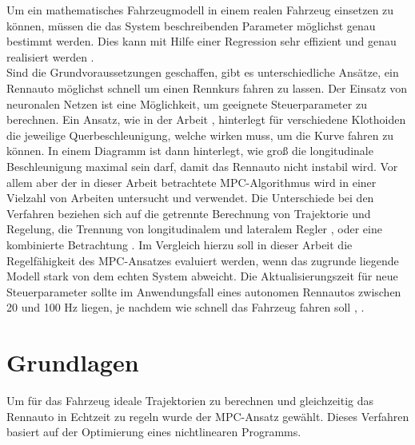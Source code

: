 \documentclass{like}
\begin{document}
Um ein mathematisches Fahrzeugmodell in einem realen Fahrzeug einsetzen zu können, müssen die das System beschreibenden Parameter möglichst genau bestimmt werden. Dies kann mit Hilfe einer Regression sehr effizient und genau realisiert werden \cite{Williams2016AggressiveDW}. \\ 
\newline
Sind die Grundvoraussetzungen geschaffen, gibt es unterschiedliche Ansätze, ein Rennauto möglichst schnell um einen Rennkurs fahren zu lassen. Der Einsatz von neuronalen Netzen \cite{6374146} ist eine Möglichkeit, um geeignete Steuerparameter zu berechnen. 
Ein Ansatz, wie in der Arbeit \cite{KRITAYAKIRANA2010548}, hinterlegt für verschiedene Klothoiden die jeweilige Querbeschleunigung, welche wirken muss, um die Kurve fahren zu können. In einem Diagramm ist dann hinterlegt, wie groß die longitudinale Beschleunigung maximal sein darf, damit das Rennauto nicht instabil wird. Vor allem aber der in dieser Arbeit betrachtete \ac{MPC}-Algorithmus wird in einer Vielzahl von Arbeiten untersucht und verwendet. 
Die Unterschiede bei den Verfahren beziehen sich auf die getrennte Berechnung von Trajektorie und Regelung, die Trennung von longitudinalem und lateralem Regler \cite{MPC_Dynamic}, \cite{MPC_Dynamic_Tire_Model} oder eine kombinierte Betrachtung \cite{rc_car_1_43}. Im Vergleich hierzu soll in dieser Arbeit die Regelfähigkeit des \ac{MPC}-Ansatzes evaluiert werden, wenn das zugrunde liegende Modell stark von dem echten System abweicht.
\newline
Die Aktualisierungszeit für neue Steuerparameter sollte im Anwendungsfall eines au\-to\-nomen Rennautos zwischen 20 und 100 Hz liegen, je nachdem wie schnell das Fahrzeug fahren soll \cite{rc_car_1_43}, \cite{Williams2016AggressiveDW}.


\chapter{Grundlagen}
Um für das Fahrzeug ideale Trajektorien zu berechnen und gleichzeitig das Rennauto in Echtzeit zu regeln wurde der \ac{MPC}-Ansatz gewählt. Dieses Verfahren basiert auf der Optimierung eines nichtlinearen Programms.
 
\end{document}
